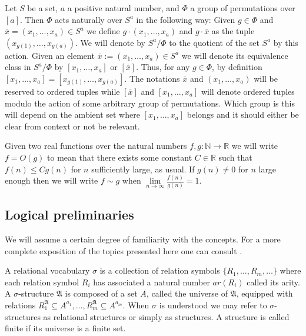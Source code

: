 \documentclass[12pt,notitlepage,a4paper]{article}
\theoremstyle{definition}
\newcommand{\R}{\mathbb{R}}
\newcommand{\N}{\mathbb{N}}
\newcommand{\Ln}{\lim\limits_{n\to \infty}}
\begin{document}
Let $S$ be a set, $a$ a positive natural number, 
and $\Phi$ a group of permutations over 
$[a]$. Then $\Phi$ acts naturally over
$S^a$ in the following way: Given $g\in \Phi$ and
$\overline{x}=(x_1,\dots,x_a)\in S^a$ we define 
$g\cdot(x_1,\dots,x_a)$ and $g\cdot \overline{x}$ 
as the tuple $(x_{g(1)},\dots,x_{g(a)})$. 
We will denote by $S^a/\Phi$ to the quotient
of the set $S^a$ by this action. Given an element
$\overline{x}:=(x_1,\dots, x_a)\in S^a$ we will denote its equivalence
class in $S^a/\Phi$ by $[x_1,\dots,x_a]$ or $[\overline{x}]$.
Thus, for any
$g\in \Phi$, by definition $[x_1,\dots,x_a]=[x_{g(1)}
,\dots,x_{g(a)}]$. The notations $\overline{x}$ and
$(x_1,\dots, x_a)$ 
will be reserved 
to ordered tuples while 
$[\overline{x}]$ and
$[x_1,\dots,x_a]$ will denote ordered tuples modulo the
action of some arbitrary group of permutations. Which group is
this will depend on the ambient set where $[x_1,\dots,x_a]$ belongs
and it should either be clear from context or not be relevant.\par
\par
Given two real functions over the natural numbers 
$f,g:\N \rightarrow \R$ we will write $f=O(g)$ to 
mean that there exists some constant $C\in \R$
such that $f(n)\leq Cg(n)$ for $n$ sufficiently large, 
as usual.
If $g(n)\neq 0$ for $n$ large enough then
we will write $f\sim g$ when $\Ln \frac{f(n)}{g(n)}=1$.\par




\subsection{Logical preliminaries}
We will assume a certain degree of familiarity with the 
concepts. For a more complete exposition of the topics 
presented here one can consult \cite{ebbinghaus2013mathematical}.

A relational vocabulary $\sigma$ is a collection of
relation symbols $\{R_1,\dots, R_m,\dots\}$
where each relation symbol $R_i$ has associated a natural
number $ar(R_i)$ called its arity.
A $\sigma$-structure $\mathfrak{A}$ is composed of
a set $A$, called the universe of $\mathfrak{A}$, equipped with
relations $R_1^{\mathfrak{A}}\subseteq A^{a_1},
\dots, R_m^{\mathfrak{A}}\subseteq A^{a_m}$. When $\sigma$
is understood we may refer to $\sigma$-structures as relational
structures or simply as structures.
A structure is called finite if its universe is a finite set. \par
\end{document}
